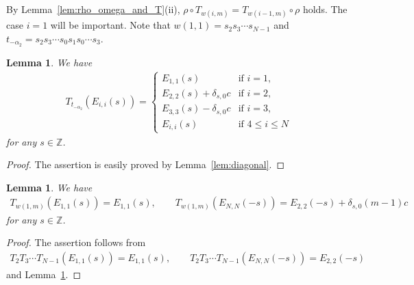 \documentclass[11pt]{article}
\newtheorem{lem}[thm]{Lemma}
\theoremstyle{definition}
\numberwithin{equation}{section}
\newcommand{\bbZ}{\mathbb{Z}}
\begin{document}
By Lemma~\ref{lem:rho_omega_and_T}(ii), $\rho \circ T_{w(i,m)} = T_{w(i-1,m)} \circ \rho$ holds. The case $i=1$ will be important. Note that $w(1,1)=s_2 s_3 \cdots s_{N-1}$ and $t_{-\alpha_2} = s_2 s_3 \cdots s_0 s_1 s_0 \cdots s_3$.
\begin{lem}\label{lem:diagonal2}We have
\begin{gather*}
T_{t_{-\alpha_2}}(E_{i,i}(s)) = \begin{cases}
E_{1,1}(s) & \text{if $i=1$}, \\
E_{2,2}(s) + \delta_{s,0}c & \text{if $i=2$}, \\
E_{3,3}(s) - \delta_{s,0}c & \text{if $i=3$}, \\
E_{i,i}(s) & \text{if $4 \leq i \leq N$}
\end{cases}
\end{gather*}
for any $s \in \bbZ$.
\end{lem}
\begin{proof}The assertion is easily proved by Lemma~\ref{lem:diagonal}.
\end{proof}
\begin{lem}\label{lem:i=1_partial}We have
\begin{gather*}
T_{w(1,m)}(E_{1,1}(s)) = E_{1,1}(s),\qquad T_{w(1,m)}(E_{N,N}(-s)) = E_{2,2}(-s) + \delta_{s,0}(m-1)c
\end{gather*}
for any $s \in \bbZ$.
\end{lem}
\begin{proof}The assertion follows from
\begin{gather*}
T_2 T_3 \cdots T_{N-1} (E_{1,1}(s)) = E_{1,1}(s), \qquad T_2 T_3 \cdots T_{N-1} (E_{N,N}(-s)) = E_{2,2}(-s)
\end{gather*}
and Lemma~\ref{lem:diagonal2}.
\end{proof}
\end{document}
